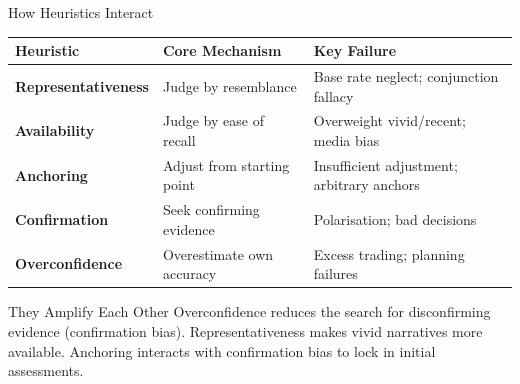 \documentclass[aspectratio=169]{beamer}
\begin{document}
\begin{frame}{How Heuristics Interact}
\begin{center}
\begin{tabular}{p{2.8cm}p{4cm}p{4.5cm}}
\toprule
\textbf{Heuristic} & \textbf{Core Mechanism} & \textbf{Key Failure}\\
\midrule
\textbf{Representativeness} & Judge by resemblance & Base rate neglect; conjunction fallacy\\[0.3em]
\textbf{Availability} & Judge by ease of recall & Overweight vivid/recent; media bias\\[0.3em]
\textbf{Anchoring} & Adjust from starting point & Insufficient adjustment; arbitrary anchors\\[0.3em]
\textbf{Confirmation} & Seek confirming evidence & Polarisation; bad decisions\\[0.3em]
\textbf{Overconfidence} & Overestimate own accuracy & Excess trading; planning failures\\
\bottomrule
\end{tabular}
\end{center}
\begin{exampleblock}{They Amplify Each Other}
Overconfidence reduces the search for disconfirming evidence (confirmation bias). Representativeness makes vivid narratives more available. Anchoring interacts with confirmation bias to lock in initial assessments.
\end{exampleblock}
\end{frame}
\end{document}
